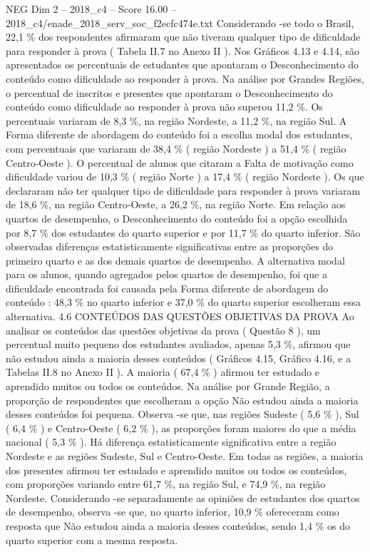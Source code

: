\begin{textsample}{NEG Dim 2 – 2018\_c4 – Score 16.00 – 2018\_c4/enade\_2018\_serv\_soc\_f2ecfc474e.txt}
Considerando -se todo o Brasil, 22,1 \% dos respondentes afirmaram que não tiveram qualquer tipo de dificuldade para responder à prova ( Tabela II.7 no Anexo II ).
Nos Gráficos 4.13 e 4.14, são apresentados os percentuais de estudantes que apontaram o Desconhecimento do conteúdo como dificuldade ao responder à prova.
Na análise por Grandes Regiões, o percentual de inscritos e presentes que apontaram o Desconhecimento do conteúdo como dificuldade ao responder à prova não superou 11,2 \%.
Os percentuais variaram de 8,3 \%, na região Nordeste, a 11,2 \%, na região Sul.
A Forma diferente de abordagem do conteúdo foi a escolha modal dos estudantes, com percentuais que variaram de 38,4 \% ( região Nordeste ) a 51,4 \% ( região Centro-Oeste ).
O percentual de alunos que citaram a Falta de motivação como dificuldade variou de 10,3 \% ( região Norte ) a 17,4 \% ( região Nordeste ).
Os que declararam não ter qualquer tipo de dificuldade para responder à prova variaram de 18,6 \%, na região Centro-Oeste, a 26,2 \%, na região Norte.
Em relação aos quartos de desempenho, o Desconhecimento do conteúdo foi a opção escolhida por 8,7 \% dos estudantes do quarto superior e por 11,7 \% do quarto inferior.
São observadas diferenças estatisticamente significativas entre as proporções do primeiro quarto e as dos demais quartos de desempenho.
A alternativa modal para os alunos, quando agregados pelos quartos de desempenho, foi que a dificuldade encontrada foi causada pela Forma diferente de abordagem do conteúdo : 48,3 \% no quarto inferior e 37,0 \% do quarto superior escolheram essa alternativa. 4.6 CONTEÚDOS DAS QUESTÕES OBJETIVAS DA PROVA Ao analisar os conteúdos das questões objetivas da prova ( Questão 8 ), um percentual muito pequeno dos estudantes avaliados, apenas 5,3 \%, afirmou que não estudou ainda a maioria desses conteúdos ( Gráficos 4.15, Gráfico 4.16, e a Tabelas II.8 no Anexo II ).
A maioria ( 67,4 \% ) afirmou ter estudado e aprendido muitos ou todos os conteúdos.
Na análise por Grande Região, a proporção de respondentes que escolheram a opção Não estudou ainda a maioria desses conteúdos foi pequena.
Observa -se que, nas regiões Sudeste ( 5,6 \% ), Sul ( 6,4 \% ) e Centro-Oeste ( 6,2 \% ), as proporções foram maiores do que a média nacional ( 5,3 \% ).
Há diferença estatisticamente significativa entre a região Nordeste e as regiões Sudeste, Sul e Centro-Oeste.
Em todas as regiões, a maioria dos presentes afirmou ter estudado e aprendido muitos ou todos os conteúdos, com proporções variando entre 61,7 \%, na região Sul, e 74,9 \%, na região Nordeste.
Considerando -se separadamente as opiniões de estudantes dos quartos de desempenho, observa -se que, no quarto inferior, 10,9 \% ofereceram como resposta que Não estudou ainda a maioria desses conteúdos, sendo 1,4 \% os do quarto superior com a mesma resposta.

\end{textsample}
